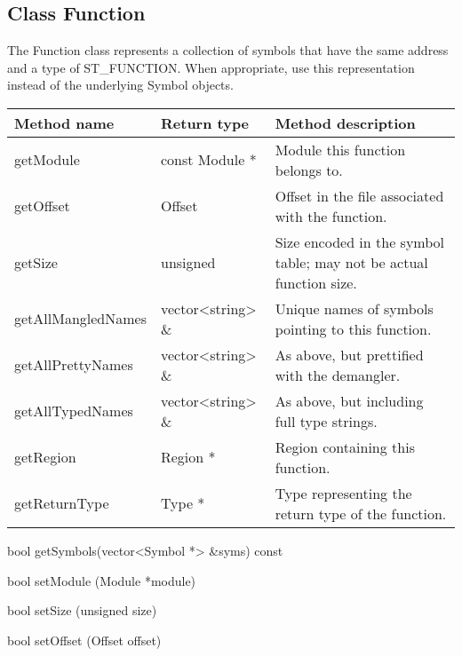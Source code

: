 \subsection{Class Function}\label{Function}
The Function class represents a collection of symbols that have the same address
and a type of ST\_FUNCTION. When appropriate, use this representation instead of the underlying Symbol objects. 

\begin{tabular}{p{1.25in}p{1.125in}p{3.125in}}
	Method name & Return type & Method description \\
	\hline
	getModule & const Module * & Module this function belongs to. \\
	getOffset & Offset & Offset in the file associated with the function. \\
	getSize & unsigned & Size encoded in the symbol table; may not be actual function size. \\
	getAllMangledNames & vector<string> \& & Unique names of symbols pointing to this function. \\
	getAllPrettyNames & vector<string> \& & As above, but prettified with the demangler. \\
	getAllTypedNames & vector<string> \& & As above, but including full type strings. \\
	getRegion & Region * & Region containing this function. \\
	getReturnType & Type * & Type representing the return type of the function. \\
\end{tabular}
	
\begin{apient}
bool getSymbols(vector<Symbol *> &syms) const
\end{apient}

\begin{apient}
bool setModule (Module *module)
\end{apient}

\begin{apient}
bool setSize (unsigned size)
\end{apient}

\begin{apient}
bool setOffset (Offset offset)
\end{apient}

